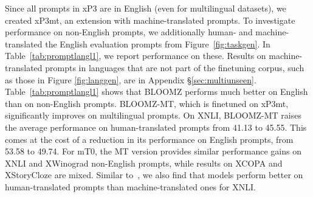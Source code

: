 \documentclass[11pt]{article}
\begin{document}
\begin{table}[htbp]
    \begin{center}
    \caption{Comparison between EN (English), MT (machine-translated) and HT (human-translated) prompts for 176B BLOOMZ and 13B mT0 models finetuned on either only English or English and machine-translated multilingual prompts (-MT).}
    \label{tab:promptlangl1}
    \end{center}
\end{table}
 
Since all prompts in xP3 are in English (even for multilingual datasets), we created xP3mt, an extension with machine-translated prompts. To investigate performance on non-English prompts, we additionally human- and machine-translated the English evaluation prompts from Figure~\ref{fig:taskgen}. In Table~\ref{tab:promptlangl1}, we report performance on these. Results on machine-translated prompts in languages that are not part of the finetuning corpus, such as those in Figure \ref{fig:langgen}, are in Appendix \S\ref{sec:multiunseen}. Table~\ref{tab:promptlangl1} shows that BLOOMZ performs much better on English than on non-English prompts. BLOOMZ-MT, which is finetuned on xP3mt, significantly improves on multilingual prompts. On XNLI, BLOOMZ-MT raises the average performance on human-translated prompts from 41.13 to 45.55. This comes at the cost of a reduction in its performance on English prompts, from 53.58 to 49.74. For mT0, the MT version provides similar performance gains on XNLI and XWinograd non-English prompts, while results on XCOPA and XStoryCloze are mixed. Similar to~\citet{lin2021few}, we also find that models perform better on human-translated prompts than machine-translated ones for XNLI. 
\end{document}
